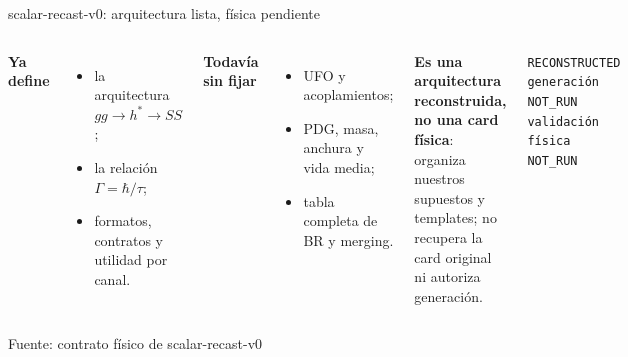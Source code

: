 \documentclass[aspectratio=169,10pt]{beamer}
\newcommand{\source}[1]{\vfill{\tiny\color{gray}Fuente: #1}}
\begin{document}
\begin{frame}{scalar-recast-v0: arquitectura lista, física pendiente}
  \begin{columns}[T]
    \textbf{Ya define}
    \begin{itemize}
      \item la arquitectura $gg\to h^*\to SS$;
      \item la relación $\Gamma=\hbar/\tau$;
      \item formatos, contratos y utilidad por canal.
    \end{itemize}
    \vspace{0.5em}
    \textbf{Todavía sin fijar}
    \begin{itemize}
      \item UFO y acoplamientos;
      \item PDG, masa, anchura y vida media;
      \item tabla completa de BR y merging.
    \end{itemize}
    \textbf{Es una arquitectura reconstruida, no una card física}: organiza
    nuestros supuestos y templates; no recupera la card original ni autoriza
    generación.
    \vspace{0.7em}

    \centering\texttt{RECONSTRUCTED}\\[0.2em]
    \texttt{generación NOT\_RUN}\\[0.2em]
    \texttt{validación física NOT\_RUN}
  \end{columns}
  \source{contrato físico de scalar-recast-v0}
\end{frame}
\end{document}
